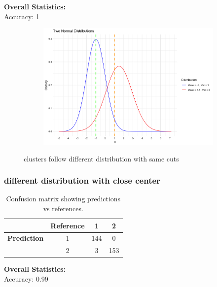 \documentclass{article}
\begin{document}
  \noindent\textbf{Overall Statistics:} \\
  Accuracy: 1

\begin{figure}[h]
  \centering
  \begin{subfigure}{0.8\textwidth}
      \centering
      \includegraphics[width=\textwidth]{images/dist_simu/3--1_1_15_2.png}
  \end{subfigure}
  \caption{clusters follow different distribution with same cuts}
  \label{fig:diff_dist}
\end{figure}

\subsubsection*{different distribution with close center}

\begin{table}[h]
  \centering
  \begin{tabular}{c|c|c|c}
            & \textbf{Reference} & 1 & 2 \\
  \hline
  \textbf{Prediction} & 1 & 144 & 0 \\
                      & 2 & 3 & 153 \\
  \end{tabular}
  \caption{Confusion matrix showing predictions vs references.}
  \label{tab:confusion_matrix}
  \end{table}
  
  \vspace{0.5cm} %
  
  \noindent\textbf{Overall Statistics:} \\
  Accuracy: 0.99
\end{document}
